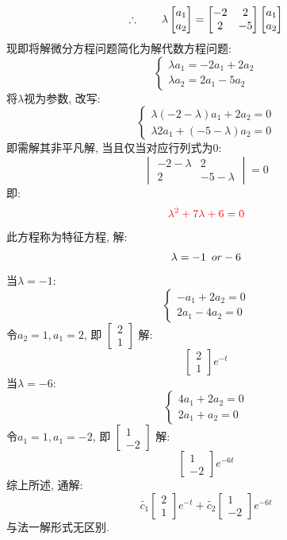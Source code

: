 \[
\therefore  \hspace*{2em}
\lambda 
\begin{bmatrix}
    a_1 \\
    a_2
\end{bmatrix}
=
\begin{bmatrix}
    -2 &  2 \\
     2 & -5
\end{bmatrix}
\begin{bmatrix}
    a_1 \\
    a_2
\end{bmatrix}
\]
现即将解微分方程问题简化为解代数方程问题:
\[
\begin{cases}
    \lambda a_1 = -2 a_1 + 2 a_2\\
    \lambda a_2 = 2 a_1 - 5 a_2
\end{cases}
\]
将$\lambda$视为参数, 改写:
\[
\begin{cases}
    \lambda (-2 - \lambda)a_1 + 2 a_2 = 0\\
    \lambda 2 a_1 +(-5 - \lambda) a_2 = 0
\end{cases}
\]
即需解其非平凡解, 当且仅当对应行列式为$0$:
\[
\begin{vmatrix}
    -2 - \lambda & 2 \\
    2 & -5 - \lambda
\end{vmatrix}
= 0
\]
即:
\[
\textcolor{red}{\lambda^2 + 7 \lambda + 6 = 0}
\]
此方程称为特征方程, 解:
\[ \lambda = -1 \hspace*{0.5em} or -6 \]
当$\lambda = -1$:
\[
\begin{cases}
    -a_1 + 2 a_2 = 0 \\
    2 a_1 -4 a_2 = 0
\end{cases}
\]
令$a_2 = 1,  a_1= 2$, 即 
$\begin{bmatrix}
    2 \\
    1
\end{bmatrix}$  解:
\[
\begin{bmatrix}
    2 \\
    1
\end{bmatrix}
e^{-t}
\]
当$\lambda = -6$:
\[
\begin{cases}
    4a_1 + 2 a_2 = 0 \\
    2 a_1 + a_2 = 0
\end{cases}
\]
令$a_1 = 1,  a_1= -2$, 即 
$\begin{bmatrix}
    1 \\
    -2
\end{bmatrix}$  解:
\[
\begin{bmatrix}
    1 \\
    -2
\end{bmatrix}
e^{-6t}
\]
综上所述, 通解:
\[
\tilde{c_1}
\begin{bmatrix}
    2 \\
    1
\end{bmatrix}
e^{-t}
+
\tilde{c_2}
\begin{bmatrix}
    1 \\
    -2
\end{bmatrix}
e^{-6t}
\]
与法一解形式无区别.


